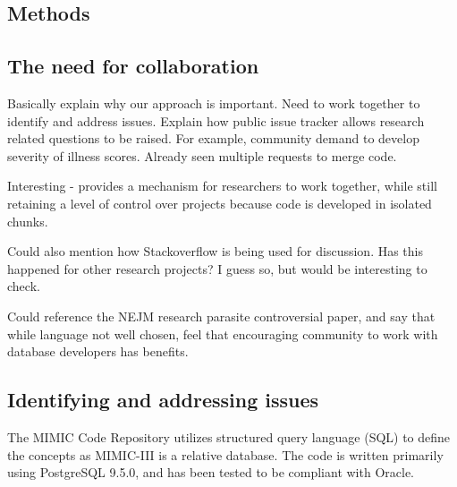 \documentclass{bioinfo}
\begin{document}
\begin{methods}
\section{Methods}

\subsection{The need for collaboration}



Basically explain why our approach is important. Need to work together to identify  and address issues. Explain how public issue tracker allows research related questions to be raised. For example, community demand to develop severity of illness scores. Already seen multiple requests to merge code.

Interesting - provides a mechanism for researchers to work together, while still retaining a level of control over projects because code is developed in isolated chunks.

Could also mention how Stackoverflow is being used for discussion. Has this happened for other research projects? I guess so, but would be interesting to check.

Could reference the NEJM research parasite controversial paper, and say that while language not well chosen, feel that encouraging community to work with database developers has benefits.

\subsection{Identifying and addressing issues}

The MIMIC Code Repository utilizes structured query language (SQL) to define the concepts as MIMIC-III  is a relative database. The code is written primarily using PostgreSQL 9.5.0, and has been tested to be compliant with Oracle.




\end{methods}
\end{document}
